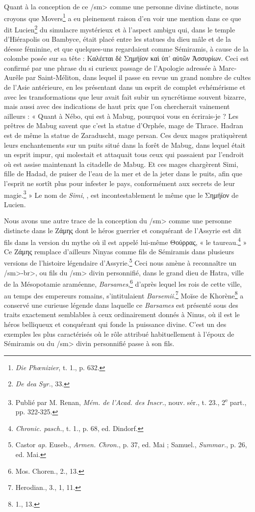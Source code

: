 \documentclass[a4paper, 11pt, oneside]{article}
\newcommand*\svgAAAG{}
\begin{document}
Quant à la conception de ce \</sm> comme une personne divine distincte, nous croyons que Movers\footnote{\emph{Die Phœnizier}, t. 1., p. 632.} a eu pleinement raison d'en voir une mention dans ce que dit Lucien\footnote{\emph{De dea Syr.}, 33.} du simulacre mystérieux et à l'aspect ambigu qui, dans le temple d'Hiérapolis ou Bambyce, était placé entre les statues du dieu mâle et de la déesse féminine, et que quelques-uns regardaient comme Sémiramis, à cause de la colombe posée sur sa tête : Καλέεται δὲ Σημήϊον καὶ ὑπ' αὐτῶν Ἀσσυρίων. Ceci est confirmé par une phrase du si curieux passage de l'Apologie adressée à Marc-Aurêle par Saint-Méliton, dans lequel il passe en revue un grand nombre de cultes de l'Asie antérieure, en les présentant dans un esprit de complet evhémérisme et avec les transformations que leur avait fait subir un syncrétisme souvent bizarre, mais aussi avec des indications de haut prix que l'on chercherait vainement ailleurs : « Quant à Nébo, qui est à Mabug, pourquoi vous en écrirais-je ? Les prêtres de Mabug savent que c'est la statue d'Orphée, mage de Thrace. Hadran est de même la statue de Zaraduscht, mage persan. Ces deux mages pratiquèrent leurs enchantements sur un puits situé dans la forêt de Mabug, dans lequel était un esprit impur, qui molestait et attaquait tous ceux qui passaient par l'endroit où est assise maintenant la citadelle de Mabug. Et ces mages chargèrent Simi, fille de Hadad, de puiser de l'eau de la mer et de la jeter dans le puits, afin que l'esprit ne sortît plus pour infester le pays, conformément aux secrets de leur magie.\footnote{Publié par M. Renan, \emph{Mém. de l'Acad. des Inscr.}, nouv. sér., t. 23., 2\textsuperscript{e} part., pp. 322-325.} » Le nom de \emph{Simi}, $\svgAAAG$, est incontestablement le même que le Σημήϊον de Lucien.

Nous avons une autre trace de la conception du \</sm> comme une personne distincte dans le Ζάμης dont le héros guerrier et conquérant de l'Assyrie est dit fils dans la version du mythe où il est appelé lui-même Θούρρας, « le taureau.\footnote{\emph{Chronic. pasch.}, t. 1., p. 68, ed. Dindorf.} » Ce Ζάμης remplace d'ailleurs Ninyas comme fils de Sémiramis dans plusieurs versions de l'histoire légendaire d'Assyrie.\footnote{Castor \emph{ap.} Euseb., \emph{Armen. Chron.}, p. 37, ed. Mai ; Samuel., \emph{Summar.}, p. 26, ed. Mai.} Ceci nous amène à reconnaître un \</sm>-\<br>, ou fils du \</sm> divin personnifié, dans le grand dieu de Hatra, ville de la Mésopotamie araméenne, \emph{Barsames},\footnote{Mos. Choren., 2., 13.} d'après lequel les rois de cette ville, au temps des empereurs romains, s'intitulaient \emph{Barsemii}.\footnote{Herodian., 3., 1, 11.} Moïse de Khorène\footnote{1., 13.} a conservé une curieuse légende dans laquelle ce \emph{Barsames} est présenté sous des traits exactement semblables à ceux ordinairement donnés à Ninus, où il est le héros belliqueux et conquérant qui fonde la puissance divine. C'est un des exemples les plus caractérisés où le rôle attribué habituellement à l'époux de Sémiramis ou du \</sm> divin personnifié passe à son fils.
\end{document}
